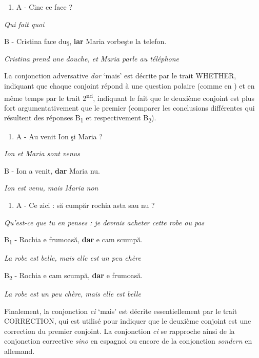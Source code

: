 \begin{enumerate}
\item \label{bkm:Ref302029658}A  - Cine ce face ?


\end{enumerate}
{\itshape
Qui fait quoi}

  B  - Cristina face duş, \textbf{iar} Maria vorbeşte la telefon.

{\itshape
Cristina prend une douche, et Maria parle au téléphone} 

La conjonction adversative \textit{dar} `mais' est décrite par le trait WHETHER, indiquant que chaque conjoint répond à une question polaire (comme en ) et en même temps par le trait 2\textsuperscript{nd}, indiquant le fait que le deuxième conjoint est plus fort argumentativement que le premier (comparer les conclusions différentes qui résultent des réponses B\textsubscript{1} et respectivement B\textsubscript{2}).


\begin{enumerate}
\item \label{bkm:Ref302030627}A  - Au venit Ion şi Maria ?


\end{enumerate}
{\itshape
Ion et Maria sont venus}

  B  - Ion a venit, \textbf{dar} Maria nu.

{\itshape
Ion est venu, mais Maria non} 


\begin{enumerate}
\item A  - Ce zici : să cumpăr rochia asta sau nu ?


\end{enumerate}
{\itshape
Qu'est-ce que tu en penses : je devrais acheter cette robe ou pas}

  B\textsubscript{1}  - Rochia e frumoasă, \textbf{dar} e cam scumpă.

{\itshape
La robe est belle, mais elle est un peu chère} 

  B\textsubscript{2}  - Rochia e cam scumpă, \textbf{dar} e frumoasă.

{\itshape
La robe est un peu chère, mais elle est belle} 

Finalement, la conjonction \textit{ci} `mais' est décrite essentiellement par le trait CORRECTION, qui est utilisé pour indiquer que le deuxième conjoint est une correction du premier conjoint. La conjonction \textit{ci} se rapproche ainsi de la conjonction corrective \textit{sino} en espagnol ou encore de la conjonction \textit{sondern} en allemand.


